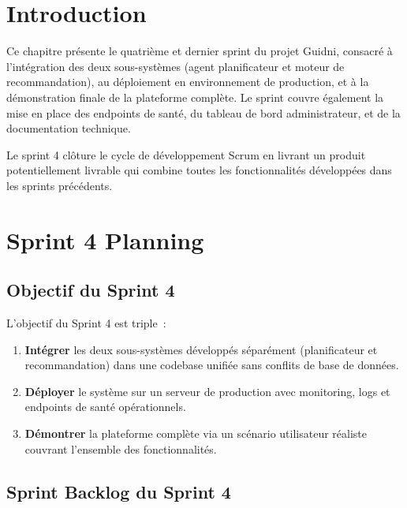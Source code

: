 
\section{Introduction}

Ce chapitre présente le quatrième et dernier sprint du projet Guidni, consacré à l'intégration
des deux sous-systèmes (agent planificateur et moteur de recommandation), au déploiement en
environnement de production, et à la démonstration finale de la plateforme complète. Le sprint
couvre également la mise en place des endpoints de santé, du tableau de bord administrateur,
et de la documentation technique.

Le sprint 4 clôture le cycle de développement Scrum en livrant un produit potentiellement
livrable qui combine toutes les fonctionnalités développées dans les sprints précédents.


\section{Sprint 4 Planning}

\subsection{Objectif du Sprint 4}

L'objectif du Sprint 4 est triple~:
\begin{enumerate}
    \item \textbf{Intégrer} les deux sous-systèmes développés séparément (planificateur et
          recommandation) dans une codebase unifiée sans conflits de base de données.
    \item \textbf{Déployer} le système sur un serveur de production avec monitoring, logs et
          endpoints de santé opérationnels.
    \item \textbf{Démontrer} la plateforme complète via un scénario utilisateur réaliste couvrant
          l'ensemble des fonctionnalités.
\end{enumerate}

\subsection{Sprint Backlog du Sprint 4}

